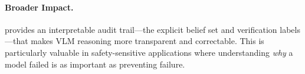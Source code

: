 \paragraph{Broader Impact.}
\bci{} provides an interpretable audit trail---the explicit belief set and
verification labels---that makes VLM reasoning more transparent and correctable.
This is particularly valuable in safety-sensitive applications where understanding
\emph{why} a model failed is as important as preventing failure.
